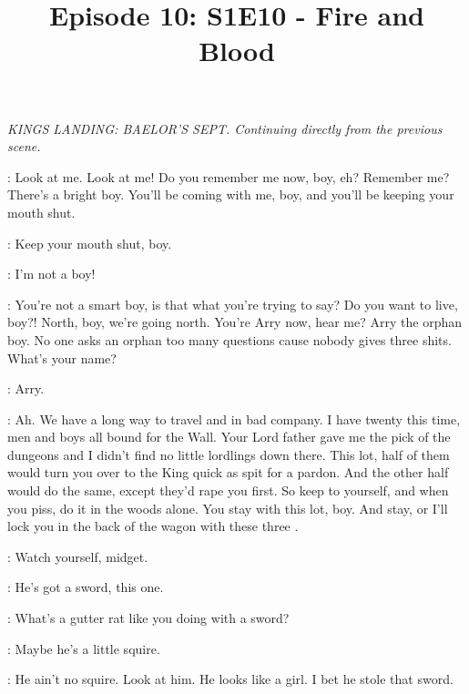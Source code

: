 

\title{Episode 10: S1E10 - Fire and Blood}
\author{}
\date{}
\maketitle




\scene

\textit{KINGS LANDING: BAELOR'S SEPT. Continuing directly from the previous scene.} 

\YOREN: Look at me. Look at me! Do you remember me now, boy, eh? Remember me? There's a bright boy. You'll be coming with me, boy, and you'll be keeping your mouth shut. 


\YOREN: Keep your mouth shut, boy. 

\ARYA: I'm not a boy! 

\YOREN: You're not a smart boy, is that what you're trying to say? Do you want to live, boy?! North, boy, we're going north.  You're Arry now, hear me? Arry the orphan boy. No one asks an orphan too many questions cause nobody gives three shits. What's your name? 

\ARYA: Arry. 


\YOREN: Ah. We have a long way to travel and in bad company. I have twenty this time, men and boys all bound for the Wall. Your Lord father gave me the pick of the dungeons and I didn't find no little lordlings down there. This lot, half of them would turn you over to the King quick as spit for a pardon. And the other half would do the same, except they'd rape you first. So keep to yourself, and when you piss, do it in the woods alone. You stay with this lot, boy. And stay, or I'll lock you in the back of the wagon with these three .

\HOTPIE: Watch yourself, midget. 

\LOMMY: He's got a sword, this one. 

\HOTPIE: What's a gutter rat like you doing with a sword? 

\LOMMY: Maybe he's a little squire. 

\HOTPIE: He ain't no squire. Look at him. He looks like a girl. I bet he stole that sword. 

